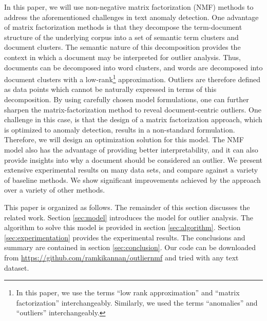 In this paper, we will
  use  non-negative matrix factorization (NMF) methods to  address the
  aforementioned challenges in text anomaly detection. One
  advantage of matrix factorization methods is that they decompose  the term-document
 structure of the underlying corpus into a set of semantic term clusters and document clusters.
 The semantic nature of this decomposition provides the  context in
 which a document may be interpreted for outlier analysis.
 Thus, documents can be decomposed into word clusters, and words are
 decomposed into document clusters with a low-rank\footnote{In this paper, we use  the terms  ``low rank
approximation'' and ``matrix factorization'' interchangeably.
Similarly, we used the terms  ``anomalies'' and ``outliers''
interchangeably.} approximation.
 Outliers are therefore defined as data points which cannot be
 naturally expressed in terms of this decomposition.
   By using carefully chosen model formulations,
 one can further sharpen the matrix-factorization method to reveal
 document-centric outliers. One  challenge in this case, is that the
 design of a matrix factorization approach, which is optimized to
 anomaly detection, results in a non-standard formulation.
 Therefore, we will design an optimization solution for this model.
 The NMF model also has the advantage of providing better
 interpretability, and it can also provide insights into why a
 document should be considered an outlier.   We present extensive
experimental results  on many   data sets, and compare against a
variety of baseline methods. We show significant improvements
achieved by the approach over a variety of other methods.

This paper is organized as follows. The remainder of this section
discusses the related work.  Section \ref{sec:model} introduces the
model for outlier analysis. The algorithm to solve  this model is
provided in section \ref{sec:algorithm}. Section
\ref{sec:experimentation} provides the experimental results. The
conclusions and summary are contained in section
\ref{sec:conclusion}. Our code can be downloaded from 
\url{https://github.com/ramkikannan/outliernmf} and 
tried with any text dataset. 
